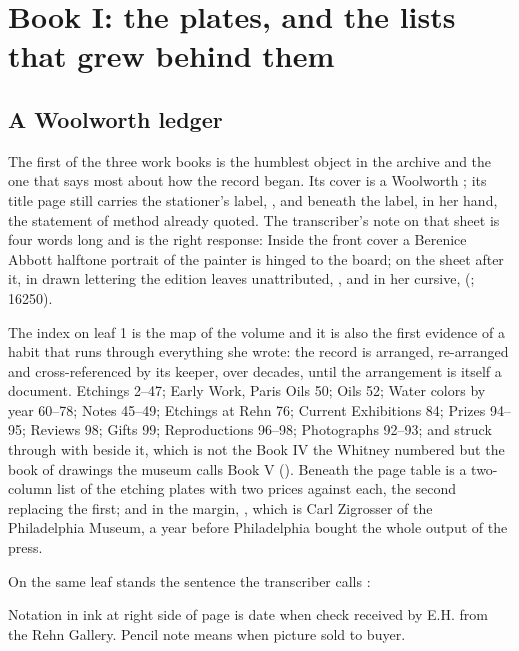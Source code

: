 \chapter{Book I: the plates, and the lists that grew behind them}

\section{A Woolworth ledger}

The first of the three work books is the humblest object in the archive and the one that says most about how the record began. Its cover is a Woolworth ; its title page still carries the stationer's label, , and beneath the label, in her hand, the statement of method already quoted. The transcriber's note on that sheet is four words long and is the right response:  Inside the front cover a Berenice Abbott halftone portrait of the painter is hinged to the board; on the sheet after it, in drawn lettering the edition leaves unattributed, , and in her cursive,  (; 16250).

The index on leaf 1 is the map of the volume and it is also the first evidence of a habit that runs through everything she wrote: the record is arranged, re-arranged and cross-referenced by its keeper, over decades, until the arrangement is itself a document. Etchings 2--47; Early Work, Paris Oils 50; Oils 52; Water colors by year 60--78; Notes 45--49; Etchings at Rehn 76; Current Exhibitions 84; Prizes 94--95; Reviews 98; Gifts 99; Reproductions 96--98; Photographs 92--93; and  struck through with  beside it, which is not the Book IV the Whitney numbered but the book of drawings the museum calls Book V (). Beneath the page table is a two-column list of the etching plates with two prices against each, the second replacing the first; and in the margin, , which is Carl Zigrosser of the Philadelphia Museum, a year before Philadelphia bought the whole output of the press.

On the same leaf stands the sentence the transcriber calls :

\begin{leafquote}
Notation in ink at right side of page is date when check received by E.H. from the Rehn Gallery. Pencil note means when picture sold to buyer.
\end{leafquote}

